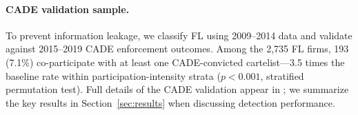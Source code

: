\paragraph{CADE validation sample.}
\label{sec:cade_sample}
To prevent information leakage, we classify FL using 2009--2014 data
and validate against 2015--2019 CADE enforcement outcomes. Among
the 2,735 FL firms, 193 (7.1\%) co-participate with at least one
CADE-convicted cartelist---3.5 times the baseline rate within
participation-intensity strata ($p < 0.001$, stratified permutation
test). Full details of the CADE validation appear in
\citet{genicolomartins2026screening}; we summarize the key results in
Section~\ref{sec:results} when discussing detection performance.


